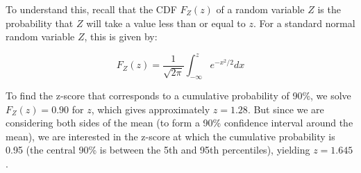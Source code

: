To understand this, recall that the CDF $F_Z(z)$ of a random variable $Z$ is the probability that $Z$ will take a value less than or equal to $z$. For a standard normal random variable $Z$, this is given by:

\[
F_Z(z) = \frac{1}{\sqrt{2\pi}} \int_{-\infty}^{z} e^{-x^2/2} dx
\]

To find the z-score that corresponds to a cumulative probability of 90\%, we solve $F_Z(z) = 0.90$ for $z$, which gives approximately $z = 1.28$. But since we are considering both sides of the mean (to form a 90\% confidence interval around the mean), we are interested in the z-score at which the cumulative probability is 0.95 (the central 90\% is between the 5th and 95th percentiles), yielding $z = 1.645$.

